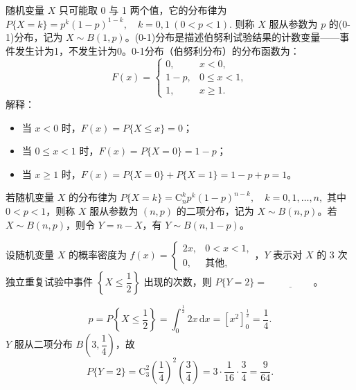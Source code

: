 \documentclass[lang=cn,11pt]{elegantbook}
\begin{document}
\begin{definition}[(0-1)分布]\label{def:0-1-dist}
随机变量 $X$ 只可能取 0 与 1 两个值，它的分布律为
\(
P\{X = k\} = p^k (1-p)^{1-k},\quad k=0,1\ (0 < p < 1).
\)
则称 $X$ 服从参数为 $p$ 的(0-1)分布，记为 $X \sim B(1,p)$。(0-1)分布是描述伯努利试验结果的计数变量——事件发生计为1，不发生计为0。0-1分布（伯努利分布）的分布函数为：
\[
F(x)=
\begin{cases}
0, & x<0, \\
1-p, & 0\leqslant x<1, \\
1, & x\geqslant1.
\end{cases}
\]
解释：
\begin{itemize}
    \item 当 $x<0$ 时，$F(x)=P\{X\leqslant x\}=0$；
    \item 当 $0\leqslant x<1$ 时，$F(x)=P\{X=0\}=1-p$；
    \item 当 $x\geqslant1$ 时，$F(x)=P\{X=0\}+P\{X=1\}=1-p+p=1$。
\end{itemize}
\end{definition}

\begin{definition}[二项分布]\label{def:binomial-dist}
若随机变量 $X$ 的分布律为
\(
P\{X = k\} = \mathrm{C}_n^k p^k (1-p)^{n-k},\quad k=0,1,\dots,n,
\)
其中 $0 < p < 1$，则称 $X$ 服从参数为 $(n,p)$ 的二项分布，记为 $X \sim B(n,p)$。若 $X \sim B(n,p)$，则令 $Y = n - X$，有 $Y \sim B(n,1-p)$。
\end{definition}

\begin{exercise}[概率密度与二项分布结合]\label{exer:2-41}\label{exer:src-2015-spring-a-i-05}
设随机变量 $X$ 的概率密度为 $f(x)=\begin{cases}2x, & 0<x<1, \\ 0, & \text{其他},\end{cases}$，$Y$ 表示对 $X$ 的 3 次独立重复试验中事件 $\left\{X\leqslant\dfrac{1}{2}\right\}$ 出现的次数，则 $P\{Y=2\}=\underline{\hspace{2cm}}$。
\end{exercise}
\begin{solution}
\[
p = P\left\{X\leqslant\frac{1}{2}\right\} = \int_0^{\frac{1}{2}}2x\,\mathrm{d}x = \left[x^2\right]_0^{\frac{1}{2}} = \frac{1}{4}.
\]
$Y$ 服从二项分布 $B\left(3,\dfrac{1}{4}\right)$，故
\[
P\{Y=2\} = \mathrm{C}_3^2\left(\frac{1}{4}\right)^2\left(\frac{3}{4}\right) = 3\cdot\frac{1}{16}\cdot\frac{3}{4} = \frac{9}{64}.
\]
\end{solution}
\end{document}
